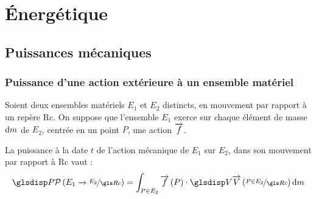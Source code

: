\chapter{\'Energétique}

\section{Puissances mécaniques}
	\subsection{Puissance d'une action extérieure à un ensemble matériel}
Soient deux ensembles matériels $E_1$ et $E_2$ distincts, en mouvement par rapport à un repère \gls{Rc}. On suppose que l'ensemble $E_1$ exerce sur chaque élément de masse $\mathrm{d}m$ de $E_2$, centrée en un point $P$, une action $\overrightarrow{f}$.

\begin{definition}
	La puissance à la date $t$ de l'action mécanique de $E_1$ sur $E_2$, dans son mouvement par rapport à \gls{Rc} vaut :
	\begin{equation}
		\puiss{E_1}{E_2}=\ints[E_2]{\vect{f}\left(P\right)\cdot\V{P}{E_2}}
		\label{eq:def-puissance}
	\end{equation}
\end{definition}

